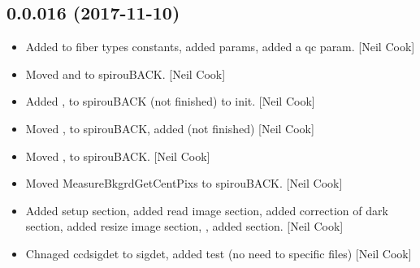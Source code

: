 \documentclass[a4paper,10pt,english]{report}
\begin{document}
\subsection{0.0.016 (2017-11-10)}
\label{\detokenize{misc/changelog:id534}}\begin{itemize}
\item {} 
Added  to fiber types constants, added  params, added a
qc param. {[}Neil Cook{]}

\item {} 
Moved  and
 to spirouBACK. {[}Neil Cook{]}

\item {} 
Added , 
to spirouBACK  (not finished) to init.
{[}Neil Cook{]}

\item {} 
Moved , 
to spirouBACK, added  (not finished) {[}Neil
Cook{]}

\item {} 
Moved , 
to spirouBACK. {[}Neil Cook{]}

\item {} 
Moved MeasureBkgrdGetCentPixs to spirouBACK. {[}Neil Cook{]}

\item {} 
Added setup section, added read image section, added correction of
dark section, added resize image section, , added  section.
{[}Neil Cook{]}

\item {} 
Chnaged ccdsigdet to sigdet, added test (no need to specific files)
{[}Neil Cook{]}

\end{itemize}
\end{document}
